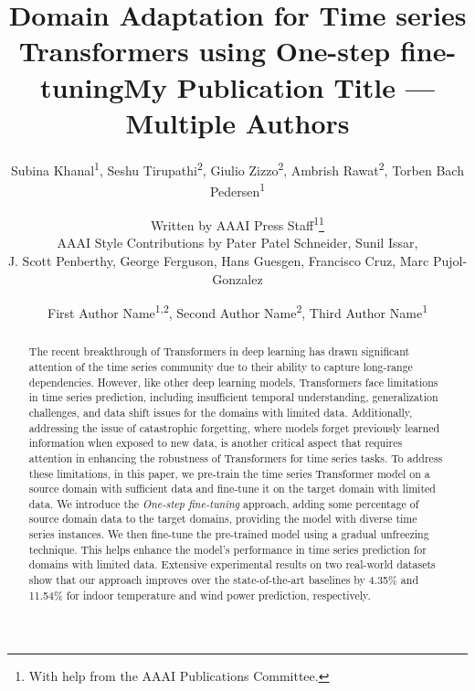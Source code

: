 \documentclass[letterpaper]{article} %
\title{Domain Adaptation for Time series Transformers using One-step fine-tuning}
\author{
   Subina Khanal\textsuperscript{\rm 1},
   Seshu Tirupathi\textsuperscript{\rm 2},
   Giulio Zizzo\textsuperscript{\rm 2},
   Ambrish Rawat\textsuperscript{\rm 2},
   Torben Bach Pedersen\textsuperscript{\rm 1}
}
\author{
    Written by AAAI Press Staff\textsuperscript{\rm 1}\thanks{With help from the AAAI Publications Committee.}\\
    AAAI Style Contributions by Pater Patel Schneider,
    Sunil Issar,\\
    J. Scott Penberthy,
    George Ferguson,
    Hans Guesgen,
    Francisco Cruz\equalcontrib,
    Marc Pujol-Gonzalez\equalcontrib
}
\title{My Publication Title --- Multiple Authors}
\author {
    First Author Name\textsuperscript{\rm 1,\rm 2},
    Second Author Name\textsuperscript{\rm 2},
    Third Author Name\textsuperscript{\rm 1}
}
\begin{document}
\maketitle

\begin{abstract}
The recent breakthrough of Transformers in deep learning has drawn significant attention of the time series community due to their ability to capture long-range dependencies. However, like other deep learning models, Transformers face limitations in time series prediction, including insufficient temporal understanding, generalization challenges, and data shift issues for the domains with limited data. Additionally, addressing the issue of catastrophic forgetting, where models forget previously learned information when exposed to new data, is another critical aspect that requires attention in enhancing the robustness of Transformers for time series tasks. To address these limitations, in this paper, we pre-train the time series Transformer model on a source domain with sufficient data and fine-tune it on the target domain with limited data. We introduce the {\em One-step fine-tuning} approach, adding some percentage of source domain data to the target domains, providing the model with diverse time series instances. We then fine-tune the pre-trained model using a gradual unfreezing technique. This helps enhance the model's performance in time series prediction for domains with limited data. Extensive experimental results on two real-world datasets show that our approach improves over the state-of-the-art baselines by 4.35\% and 11.54\% for indoor temperature and wind power prediction, respectively.

\end{abstract}
\end{document}
